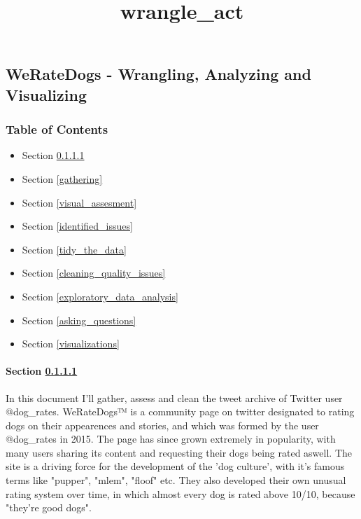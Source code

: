 \documentclass[11pt]{article}
\title{wrangle\_act}
\providecommand{\tightlist}{%
      \setlength{\itemsep}{0pt}\setlength{\parskip}{0pt}}
\begin{document}
    
    
    \maketitle
    
    

    
    \subsection{WeRateDogs - Wrangling, Analyzing and
Visualizing}\label{weratedogs---wrangling-analyzing-and-visualizing}

    \subsubsection{Table of Contents}\label{table-of-contents}

\begin{itemize}
\tightlist
\item
   Section \ref{introduction}
\item
   Section \ref{gathering}
\item
  Section \ref{visual_assesment}
\item
  Section \ref{identified_issues}
\item
  Section \ref{tidy_the_data}
\item
  Section \ref{cleaning_quality_issues}
\item
   Section \ref{exploratory_data_analysis}
\item
   Section \ref{asking_questions}
\item
   Section \ref{visualizations}
\end{itemize}

    \paragraph{\texorpdfstring{Section \ref{introduction}}{}}\label{introduction}

In this document I'll gather, assess and clean the tweet archive of
Twitter user @dog\_rates. WeRateDogs™ is a community page on twitter
designated to rating dogs on their appearences and stories, and which
was formed by the user @dog\_rates in 2015. The page has since grown
extremely in popularity, with many users sharing its content and
requesting their dogs being rated aswell. The site is a driving force
for the development of the 'dog culture', with it's famous terms like
"pupper", "mlem", "floof" etc. They also developed their own unusual
rating system over time, in which almost every dog is rated above 10/10,
because "they're good dogs".
\end{document}
